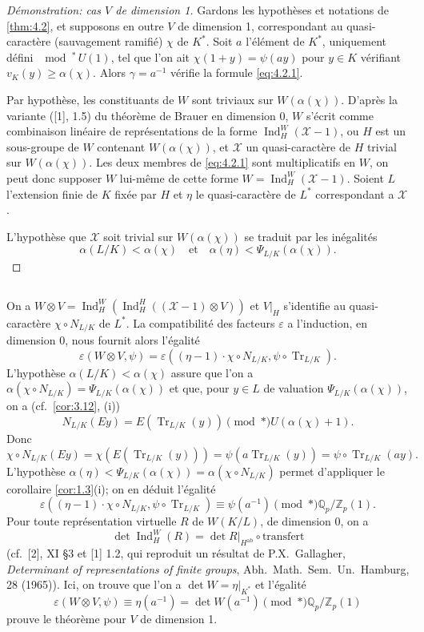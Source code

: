 \documentclass[12pt,a4paper]{article}
\theoremstyle{plain}
\theoremstyle{definition}
\theoremstyle{remark}
\DeclareMathOperator{\Ind}{Ind}
\DeclareMathOperator{\Tr}{Tr}
\newcommand{\cX}{\mathcal{X}}
\newcommand{\bQ}{\mathbb{Q}}
\newcommand{\bZ}{\mathbb{Z}}
\providecommand{\cX}{\mathcal{X}}
\providecommand{\Tr}{\operatorname{Tr}}
\begin{document}
\begin{proof}[D\'emonstration: cas $V$ de dimension 1]
Gardons les hypoth\`eses et notations de \ref{thm:4.2}, et supposons en outre $V$ de dimension 1, correspondant au quasi-caract\`ere (sauvagement ramifi\'e) $\chi$ de $K^*$. Soit $a$ l'\'el\'ement de $K^*$, uniquement d\'efini $\mod^*\, U(1)$, tel que l'on ait $\chi(1+y) = \psi(ay)$ pour $y \in K$ v\'erifiant $v_K(y) \geq \alpha(\chi)$. Alors $\gamma = a^{-1}$ v\'erifie la formule \eqref{eq:4.2.1}.

Par hypoth\`ese, les constituants de $W$ sont triviaux sur $W(\alpha(\chi))$. D'apr\`es la variante ([1], 1.5) du th\'eor\`eme de Brauer en dimension 0, $W$ s'\'ecrit comme combinaison lin\'eaire de repr\'esentations de la forme $\Ind_H^W(\cX - 1)$, ou $H$ est un sous-groupe de $W$ contenant $W(\alpha(\chi))$, et $\cX$ un quasi-caract\`ere de $H$ trivial sur $W(\alpha(\chi))$. Les deux membres de \eqref{eq:4.2.1} sont multiplicatifs en $W$, on peut donc supposer $W$ lui-m\^eme de cette forme $W = \Ind_H^W(\cX - 1)$. Soient $L$ l'extension finie de $K$ fix\'ee par $H$ et $\eta$ le quasi-caract\`ere de $L^*$ correspondant a $\cX$.

L'hypoth\`ese que $\cX$ soit trivial sur $W(\alpha(\chi))$ se traduit par les in\'egalit\'es
\[
\alpha(L/K) < \alpha(\chi) \quad \text{et} \quad \alpha(\eta) < \Psi_{L/K}(\alpha(\chi)).
\]
\end{proof}

\subsection{}
\label{sec:4.4}

On a $W \otimes V = \Ind_H^W(\Ind_H^H((\cX-1) \otimes V))$ et $V|_H$ s'identifie au quasi-caract\`ere $\chi \circ N_{L/K}$ de $L^*$. La compatibilit\'e des facteurs $\varepsilon$ a l'induction, en dimension 0, nous fournit alors l'\'egalit\'e
\[
\varepsilon(W \otimes V, \psi) = \varepsilon((\eta-1) \cdot \chi \circ N_{L/K}, \psi \circ \Tr_{L/K}).
\]
L'hypoth\`ese $\alpha(L/K) < \alpha(\chi)$ assure que l'on a $\alpha(\chi \circ N_{L/K}) = \Psi_{L/K}(\alpha(\chi))$ et que, pour $y \in L$ de valuation $\Psi_{L/K}(\alpha(\chi))$, on a (cf.~\ref{cor:3.12}, (i))
\[
N_{L/K}(Ey) = E(\Tr_{L/K}(y)) \pmod{*} U(\alpha(\chi)+1).
\]
Donc
\[
\chi \circ N_{L/K}(Ey) = \chi(E(\Tr_{L/K}(y))) = \psi(a \Tr_{L/K}(y)) = \psi \circ \Tr_{L/K}(ay).
\]
L'hypoth\`ese $\alpha(\eta) < \Psi_{L/K}(\alpha(\chi)) = \alpha(\chi \circ N_{L/K})$ permet d'appliquer le corollaire \ref{cor:1.3}(i); on en d\'eduit l'\'egalit\'e
\[
\varepsilon((\eta-1) \cdot \chi \circ N_{L/K}, \psi \circ \Tr_{L/K}) \equiv \psi(a^{-1}) \pmod{*} \bQ_p/\bZ_p(1).
\]
Pour toute repr\'esentation virtuelle $R$ de $W(K/L)$, de dimension 0, on a
\[
\det \Ind_H^W(R) = \det R|_{H^{\text{ab}}} \circ \text{transfert}
\]
(cf.~[2], XI \S 3 et [1] 1.2, qui reproduit un r\'esultat de P.X.~Gallagher, \textit{Determinant of representations of finite groups}, Abh.~Math.~Sem.~Un.~Hamburg, 28 (1965)). Ici, on trouve que l'on a $\det W = \eta|_{K^*}$ et l'\'egalit\'e
\[
\varepsilon(W \otimes V, \psi) \equiv \eta(a^{-1}) = \det W(a^{-1}) \pmod{*} \bQ_p/\bZ_p(1)
\]
prouve le th\'eor\`eme pour $V$ de dimension 1.
\end{document}
